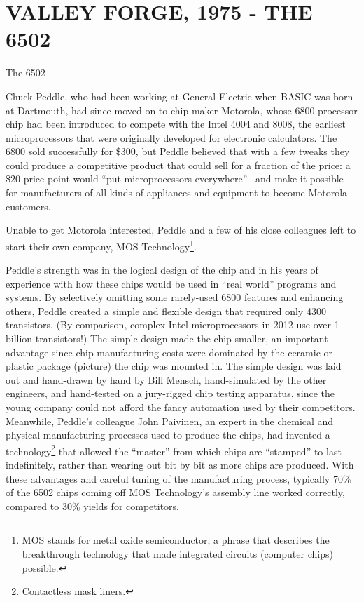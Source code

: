 
\section{VALLEY FORGE, 1975 - THE 6502}

\begin{milestone}{The 6502}

\end{milestone}

Chuck Peddle,  who had been working at General Electric when BASIC was
born at Dartmouth, had since moved on to chip maker Motorola, whose 6800
processor chip had been introduced to compete with the Intel 4004 and
8008, the earliest microprocessors that were originally developed for
electronic calculators.  The 6800 sold successfully for \$300, but
Peddle  believed that with a few tweaks they could
produce a competitive product that could sell for a fraction of the
price: a \$20 price
point would ``put
microprocessors everywhere''~\cite[p. 31]{commodore} and make it possible for
manufacturers of all kinds of appliances and equipment to become
Motorola customers.

Unable to get Motorola interested, Peddle and a few of his close
colleagues left to start their own company, MOS Technology\footnote{MOS stands for metal oxide
semiconductor, a phrase that describes the breakthrough technology that
made integrated circuits (computer chips) possible.}.

Peddle's strength was in the logical design of the chip and in his years
of experience with how these chips would be used in ``real world''
programs and systems.
By selectively omitting some rarely-used 6800 features and enhancing
others, Peddle 
created a simple and flexible design that required only 4300
transistors.
(By comparison, complex Intel microprocessors in 2012 use over 1
billion transistors!)
The simple design made the chip smaller, an important advantage since
chip manufacturing costs were dominated by the ceramic or plastic
package (picture) the chip was mounted in.
The simple design was laid out and hand-drawn by hand by Bill Mensch,
hand-simulated by the other engineers, and hand-tested on a jury-rigged
chip testing apparatus, since the young company could not afford the
fancy automation used by their competitors.
Meanwhile, Peddle's colleague John Paivinen, an expert in the chemical
and physical manufacturing processes used to produce the chips, had
invented a technology\footnote{Contactless mask liners.} that allowed
the ``master'' from which chips are ``stamped'' to last indefinitely,
rather than wearing out bit by bit as more chips are produced.
With these advantages and careful tuning of the manufacturing process,
typically 70\% of the 6502 chips coming off MOS Technology's assembly
line worked correctly, compared to 30\% yields for competitors.

